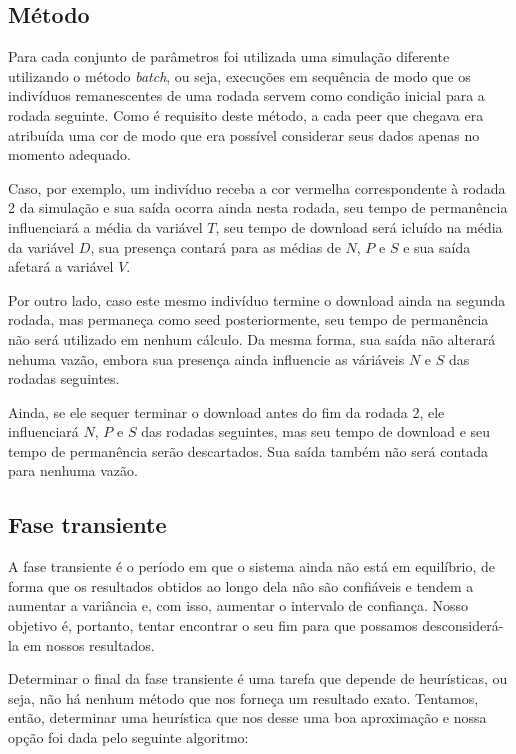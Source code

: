 \documentclass[a4paper,10pt]{article}
\begin{document}
\subsection{Método}

Para cada conjunto de parâmetros foi utilizada uma simulação diferente utilizando o método \textit{batch}, ou seja, execuções em sequência de modo que os indivíduos remanescentes de uma rodada servem como condição inicial para a rodada seguinte. Como é requisito deste método, a cada peer que chegava era atribuída uma cor de modo que era possível considerar seus dados apenas no momento adequado.

Caso, por exemplo, um indivíduo receba a cor vermelha correspondente à rodada 2 da simulação e sua saída ocorra ainda nesta rodada, seu tempo de permanência influenciará a média da variável $T$, seu tempo de download será icluído na média da variável $D$, sua presença contará para as médias de $N$, $P$ e $S$ e sua saída afetará a variável $V$.

Por outro lado, caso este mesmo indivíduo termine o download ainda na segunda rodada, mas permaneça como seed posteriormente, seu tempo de permanência não será utilizado em nenhum cálculo. Da mesma forma, sua saída não alterará nehuma vazão, embora sua presença ainda influencie as váriáveis $N$ e $S$ das rodadas seguintes.

Ainda, se ele sequer terminar o download antes do fim da rodada 2, ele influenciará $N$, $P$ e $S$ das rodadas seguintes, mas seu tempo de download e seu tempo de permanência serão descartados. Sua saída também não será contada para nenhuma vazão.

\subsection{Fase transiente} %

A fase transiente é o período em que o sistema ainda não está em equilíbrio, de forma que os resultados obtidos ao longo dela não são confiáveis e tendem a aumentar a variância e, com isso, aumentar o intervalo de confiança. Nosso objetivo é, portanto, tentar encontrar o seu fim para que possamos desconsiderá-la em nossos resultados.

Determinar o final da fase transiente é uma tarefa que depende de heurísticas, ou seja, não há nenhum método que nos forneça um resultado exato. Tentamos, então, determinar uma heurística que nos desse uma boa aproximação e nossa opção foi dada pelo seguinte algoritmo:
\end{document}
